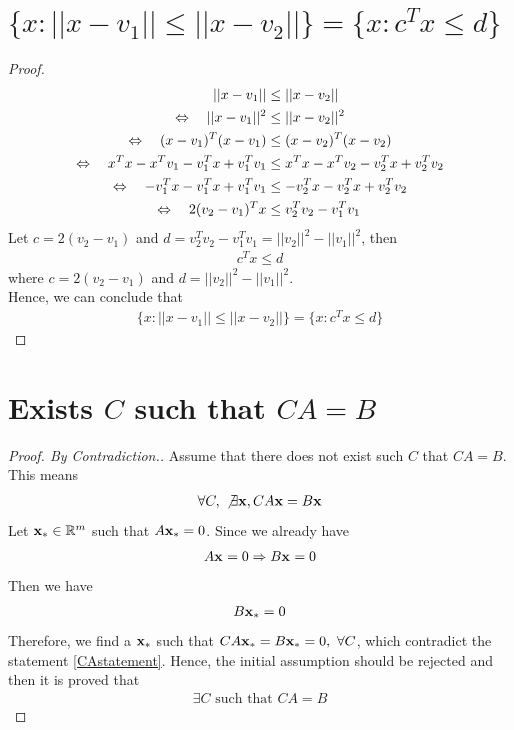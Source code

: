 \documentclass[11pt,a4paper]{article}
\begin{document}
\section{$\{x: ||x-v_1|| \leq ||x-v_2||\} = \{x: c^T x \leq d\}$}
\begin{proof}
    \begin{align}
      \hspace{0.5cm} || x - v_1 || &\leq || x - v_2|| \\
    \Leftrightarrow  \hspace{0.35cm} || x - v_1 ||^2 &\leq || x - v_2||^2 \\
    \Leftrightarrow  \hspace{0.35cm} (x-v_1)^T (x-v_1) &\leq (x - v_2)^T(x - v_2) \\
    \Leftrightarrow  \hspace{0.35cm} 
    x^Tx-x^Tv_1-v_1^Tx+v_1^Tv_1 &\leq x^Tx-x^Tv_2-v_2^Tx+v_2^Tv_2 \\
    \Leftrightarrow  \hspace{0.35cm}
    -v_1^Tx-v_1^Tx+v_1^Tv_1 &\leq -v_2^Tx-v_2^Tx+v_2^Tv_2 \\
    \Leftrightarrow  \hspace{0.35cm}
    2(v_2-v_1)^Tx &\leq v_2^Tv_2 - v_1^Tv_1
    \end{align}
    Let $c = 2(v_2-v_1)$ and 
    $d = v_2^Tv_2 - v_1^Tv_1 = ||v_2||^2 - ||v_1||^2$, then
    \begin{align}
      c^Tx \leq d
    \end{align}
    where $c = 2(v_2-v_1)$ and $d = ||v_2||^2 - ||v_1||^2$. \\
    Hence, we can conclude that 
    \begin{align}
        \{x: ||x-v_1|| \leq ||x-v_2||\} = \{x: c^T x \leq d\}
    \end{align}
\end{proof}

\setcounter{section}{7}
\section{Exists $C$ such that $CA = B$}
\begin{proof}[Proof. By Contradiction.]
    Assume that there does not exist such $C$ that $CA = B$. This means 
    \begin{align} \label {CAstatement}
        \forall C,\ \not \exists \mathbf{x}, CA\mathbf{x} = B\mathbf{x}
    \end{align}
    Let $\mathbf{x}_{*} \in \mathbb{R}^{m}$ such that $A\mathbf{x}_{*}=0$. Since we already have
    \begin{align} 
        A\mathbf{x}_{} = 0 \Rightarrow  B\mathbf{x}_{} = 0
    \end{align}
    Then we have 
    \begin{align} 
        B\mathbf{x}_{*} = 0
    \end{align}
    Therefore, we find a $\mathbf{x}_{*}$ such that $CA\mathbf{x}_{*} = B\mathbf{x}_{*} = 0,\ \forall C$,
    which contradict the statement \eqref{CAstatement}. Hence, the initial
    assumption should be rejected and then it is proved that 
    \begin{align}
        \exists C \text{ such that } CA = B
    \end{align}
\end{proof}
\end{document}
